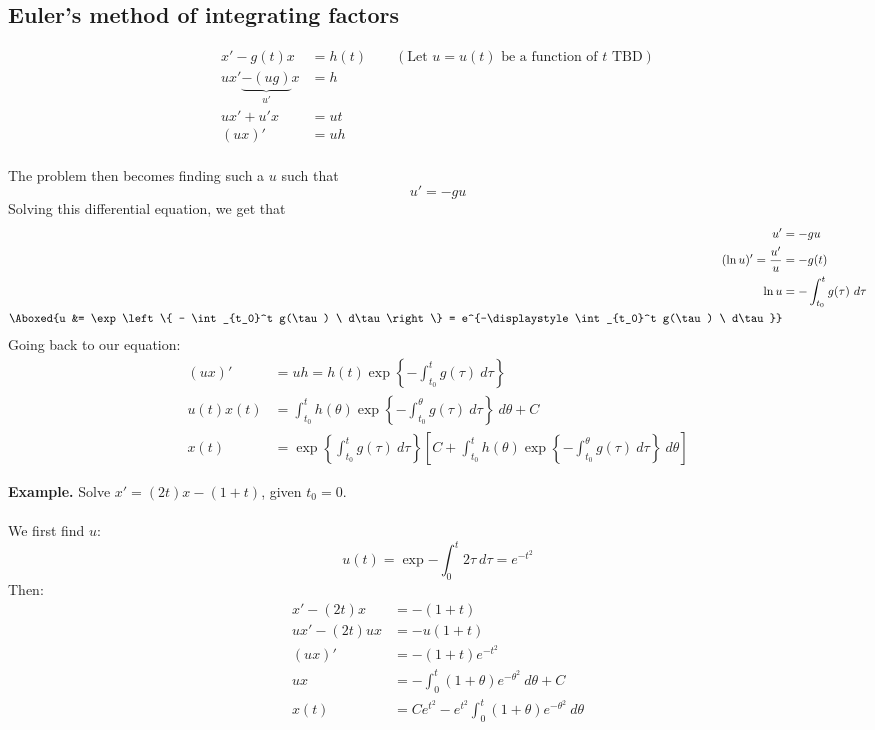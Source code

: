 \documentclass[12pt]{article}
\begin{document}
\subsection{Euler's method of integrating factors}
\[
\begin{aligned}
x' - g(t)x &= h(t) \qquad (\text{Let } u = u(t) \text{ be a function of } t \text{ TBD}) \\
ux' \underbrace{- (ug)}_{u'}x &= h \\
ux' + u'x &= ut \\
(ux)' &= uh \\
\end{aligned}
\]

The problem then becomes finding such a $u$ such that \[ u' = -gu \]
Solving this differential equation, we get that 
\[
\begin{aligned}
u' &= -gu \\
(\ln u)' = \frac{u'}{u} &= -g(t) \\
\ln u &= -\int_{t_0}^t g(\tau) \ d\tau \\
\Aboxed{u &= \exp\left\{ - \int_{t_0}^t g(\tau) \ d\tau\right\} = e^{-\displaystyle\int_{t_0}^t g(\tau) \ d\tau}} \\
\end{aligned}
\]
Going back to our equation:
\[
\begin{aligned}
(ux)' &= uh = h(t)\exp\left\{ - \int_{t_0}^t g(\tau) \ d\tau\right\} \\
u(t)x(t) &= \int_{t_0}^t h(\theta) \exp\left\{ - \int_{t_0}^{\theta} g(\tau) \ d\tau\right\} \ d\theta + C \\
x(t) &= \exp\left\{\int_{t_0}^t g(\tau) \ d\tau\right\} \left[C + \int_{t_0}^t h(\theta) \exp\left\{ - \int_{t_0}^{\theta} g(\tau) \ d\tau\right\} \ d\theta\right]
\end{aligned}
\]

\textbf{Example.} Solve $x' = (2t)x - (1+t)$, given $t_0 = 0$. \\ \\
We first find $u$:
\[ u(t) = \exp{-\int_0^t 2\tau \ d\tau} = e^{-t^2} \]
Then:
\[
\begin{aligned}
x' - (2t)x &= -(1+t) \\
ux' - (2t)ux &= -u(1+t) \\
(ux)' &= -(1+t)e^{-t^2} \\
ux &= -\int_0^t (1+\theta)e^{-\theta^2} \ d\theta + C \\
x(t) &= Ce^{t^2} - e^{t^2}\int_0^t(1+\theta)e^{-\theta^2} \ d\theta
\end{aligned}
\]
\end{document}
